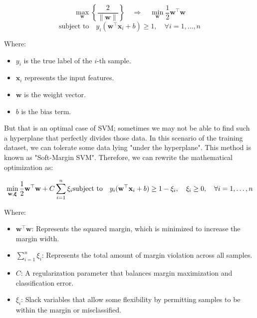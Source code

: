 \documentclass{article}
\begin{document}
\begin{equation}
    \max_{\mathbf{w}} \left\{ \frac{2}{\|\mathbf{w}\|} \right\} 
    \quad \Longrightarrow \quad 
    \min_{\mathbf{w}} \frac{1}{2} \mathbf{w}^\top \mathbf{w}
\end{equation}
\begin{equation}
    \text{subject to} \quad y_i(\mathbf{w}^\top \mathbf{x}_i + b) \geq 1, \quad \forall i = 1, \ldots, n
\end{equation}

\noindent
Where:
\begin{itemize}
    \item \( y_i \) is the true label of the \( i \)-th sample.
    \item \( \mathbf{x}_i \) represents the input features.
    \item \( \mathbf{w} \) is the weight vector.
    \item \( b \) is the bias term.
\end{itemize}

But that is an optimal case of SVM; sometimes we may not be able to find such a hyperplane that perfectly divides those data. In this scenario of the training dataset, we can tolerate some data lying "under the hyperplane". This method is known as "Soft-Margin SVM". Therefore, we can rewrite the mathematical optimization as:

\begin{equation}
    \min_{\mathbf{w}, \boldsymbol{\xi}} \frac{1}{2} \mathbf{w}^\top \mathbf{w} + C \sum_{i=1}^{n} \xi_i \\
    \text{subject to} \quad y_i(\mathbf{w}^\top \mathbf{x}_i + b) \geq 1 - \xi_i, \quad \xi_i \geq 0, \quad \forall i = 1, \ldots, n
\end{equation}

\noindent
Where:
\begin{itemize}
    \item \( \mathbf{w}^\top \mathbf{w} \): Represents the squared margin, which is minimized to increase the margin width.
    \item \( \sum_{i=1}^{n} \xi_i \): Represents the total amount of margin violation across all samples.
    \item \( C \): A regularization parameter that balances margin maximization and classification error.
    \item \( \xi_i \): Slack variables that allow some flexibility by permitting samples to be within the margin or misclassified.
\end{itemize}
\end{document}
